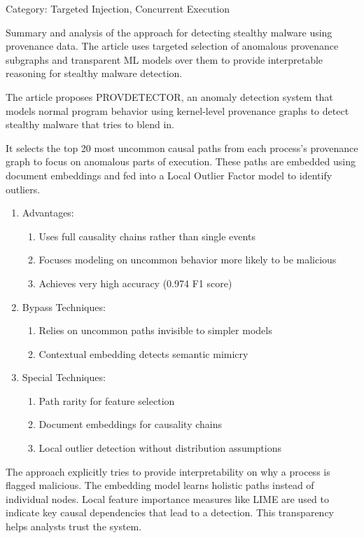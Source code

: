 \documentclass{article}
\begin{document}
Category: Targeted Injection, Concurrent Execution

Summary and analysis of the approach for detecting stealthy malware using provenance data.  The article uses targeted selection of anomalous provenance subgraphs and transparent ML models over them to provide interpretable reasoning for stealthy malware detection.

The article proposes PROVDETECTOR, an anomaly detection system that models normal program behavior using kernel-level provenance graphs to detect stealthy malware that tries to blend in.

It selects the top 20 most uncommon causal paths from each process's provenance graph to focus on anomalous parts of execution. These paths are embedded using document embeddings and fed into a Local Outlier Factor model to identify outliers.

\begin{enumerate}
\item Advantages:

  \begin{enumerate}
  \item Uses full causality chains rather than single events
  \item Focuses modeling on uncommon behavior more likely to be malicious
  \item Achieves very high accuracy (0.974 F1 score)
  \end{enumerate}

\item Bypass Techniques:

  \begin{enumerate}
  \item Relies on uncommon paths invisible to simpler models
  \item Contextual embedding detects semantic mimicry
  \end{enumerate}

\item Special Techniques:

  \begin{enumerate}
  \item Path rarity for feature selection
  \item Document embeddings for causality chains
  \item Local outlier detection without distribution assumptions
  \end{enumerate}
\end{enumerate}

The approach explicitly tries to provide interpretability on why a process is flagged malicious. The embedding model learns holistic paths instead of individual nodes. Local feature importance measures like LIME are used to indicate key causal dependencies that lead to a detection. This transparency helps analysts trust the system.
\end{document}
